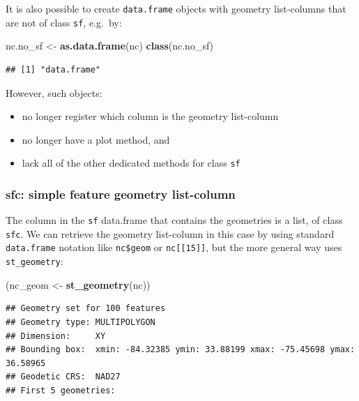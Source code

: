 \documentclass[
]{book}
\newenvironment{Shaded}{\begin{snugshade}}{\end{snugshade}}
\newcommand{\FunctionTok}[1]{\textcolor[rgb]{0.13,0.29,0.53}{\textbf{#1}}}
\newcommand{\NormalTok}[1]{#1}
\newcommand{\OtherTok}[1]{\textcolor[rgb]{0.56,0.35,0.01}{#1}}
\providecommand{\tightlist}{%
  \setlength{\itemsep}{0pt}\setlength{\parskip}{0pt}}
\begin{document}
It is also possible to create \texttt{data.frame} objects with geometry list-columns that are not of class \texttt{sf}, e.g.~by:

\begin{Shaded}
\begin{Highlighting}[]
\NormalTok{nc.no\_sf }\OtherTok{\textless{}{-}} \FunctionTok{as.data.frame}\NormalTok{(nc)}
\FunctionTok{class}\NormalTok{(nc.no\_sf)}
\end{Highlighting}
\end{Shaded}

\begin{verbatim}
## [1] "data.frame"
\end{verbatim}

However, such objects:

\begin{itemize}
\tightlist
\item
  no longer register which column is the geometry list-column
\item
  no longer have a plot method, and
\item
  lack all of the other dedicated methods for class \texttt{sf}
\end{itemize}

\hypertarget{sfc-simple-feature-geometry-list-column}{%
\subsubsection{sfc: simple feature geometry list-column}\label{sfc-simple-feature-geometry-list-column}}

The column in the \texttt{sf} data.frame that contains the geometries is a list, of class \texttt{sfc}. We can retrieve the geometry list-column in this case by using standard \texttt{data.frame} notation like \texttt{nc\$geom} or \texttt{nc{[}{[}15{]}{]}}, but the more general way uses \texttt{st\_geometry}:

\begin{Shaded}
\begin{Highlighting}[]
\NormalTok{(nc\_geom }\OtherTok{\textless{}{-}} \FunctionTok{st\_geometry}\NormalTok{(nc))}
\end{Highlighting}
\end{Shaded}

\begin{verbatim}
## Geometry set for 100 features 
## Geometry type: MULTIPOLYGON
## Dimension:     XY
## Bounding box:  xmin: -84.32385 ymin: 33.88199 xmax: -75.45698 ymax: 36.58965
## Geodetic CRS:  NAD27
## First 5 geometries:
\end{verbatim}
\end{document}
